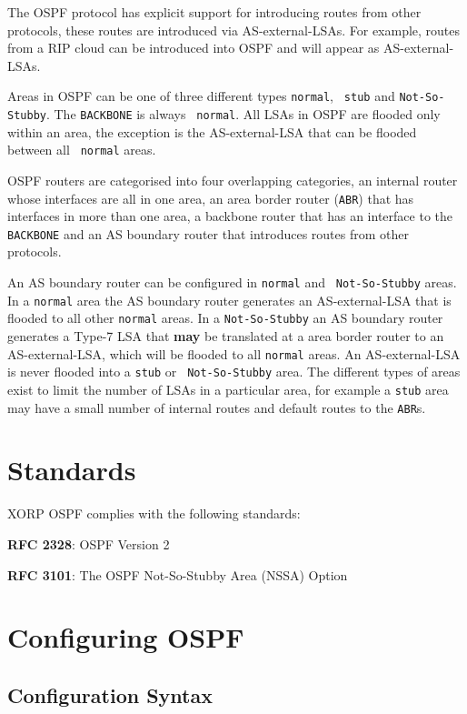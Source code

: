 The OSPF protocol has explicit support for introducing routes from
other protocols, these routes are introduced via AS-external-LSAs. For
example, routes from a RIP cloud can be introduced into OSPF and will
appear as AS-external-LSAs.

Areas in OSPF can be one of three different types {\tt normal}, {\tt
stub} and {\tt Not-So-Stubby}. The {\tt BACKBONE} is always {\tt
normal}. All LSAs in OSPF are flooded only within an area, the
exception is the AS-external-LSA that can be flooded between all {\tt
normal} areas.

OSPF routers are categorised into four overlapping categories, an
internal router whose interfaces are all in one area, an area border
router ({\tt ABR}) that has interfaces in more than one area, a backbone router
that has an interface to the {\tt BACKBONE} and an AS boundary router
that introduces routes from other protocols.

An AS boundary router can be configured in {\tt normal} and {\tt
Not-So-Stubby} areas. In a {\tt normal} area the AS boundary router
generates an AS-external-LSA that is flooded to all other {\tt normal}
areas. In a {\tt Not-So-Stubby} an AS boundary router generates a
Type-7 LSA that {\bf may} be translated at a area border router to an
AS-external-LSA, which will be flooded to all {\tt normal} areas. An
AS-external-LSA is never flooded into a {\tt stub} or {\tt
Not-So-Stubby} area. The different types of areas exist to limit the
number of LSAs in a particular area, for example a {\tt stub} area may
have a small number of internal routes and default routes to the
{\tt ABR}s.

\section{Standards}

XORP OSPF complies with the following standards:
\begin{description}
\item{\bf RFC 2328}: OSPF Version 2
\item{\bf RFC 3101}: The OSPF Not-So-Stubby Area (NSSA) Option
\end{description}

\newpage
\section{Configuring OSPF}

\subsection{Configuration Syntax}

